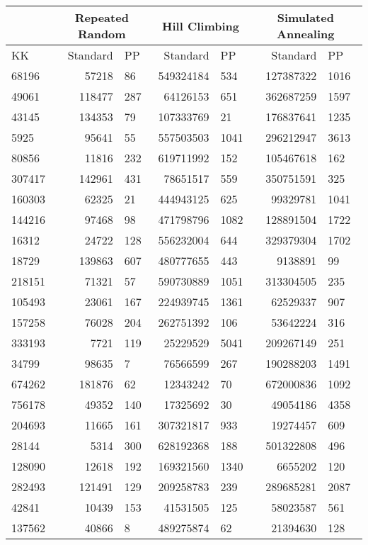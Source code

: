 \documentclass[11pt]{article}
\begin{document}
\begin{tabular}{l r l r l r l}
 & \multicolumn{2}{c}{Repeated Random} & \multicolumn{2}{c}{Hill Climbing} & \multicolumn{2}{c}{Simulated Annealing} \\ \hline
KK & Standard & PP & Standard & PP & Standard & PP \\ \hline
68196 & 57218 & 86 & 549324184 & 534 & 127387322 & 1016 \\
49061 & 118477 & 287 & 64126153 & 651 & 362687259 & 1597 \\
43145 & 134353 & 79 & 107333769 & 21 & 176837641 & 1235 \\
5925 & 95641 & 55 & 557503503 & 1041 & 296212947 & 3613 \\
80856 & 11816 & 232 & 619711992 & 152 & 105467618 & 162 \\
307417 & 142961 & 431 & 78651517 & 559 & 350751591 & 325 \\
160303 & 62325 & 21 & 444943125 & 625 & 99329781 & 1041 \\
144216 & 97468 & 98 & 471798796 & 1082 & 128891504 & 1722 \\
16312 & 24722 & 128 & 556232004 & 644 & 329379304 & 1702 \\
18729 & 139863 & 607 & 480777655 & 443 & 9138891 & 99 \\
218151 & 71321 & 57 & 590730889 & 1051 & 313304505 & 235 \\
105493 & 23061 & 167 & 224939745 & 1361 & 62529337 & 907 \\
157258 & 76028 & 204 & 262751392 & 106 & 53642224 & 316 \\
333193 & 7721 & 119 & 25229529 & 5041 & 209267149 & 251 \\
34799 & 98635 & 7 & 76566599 & 267 & 190288203 & 1491 \\
674262 & 181876 & 62 & 12343242 & 70 & 672000836 & 1092 \\
756178 & 49352 & 140 & 17325692 & 30 & 49054186 & 4358 \\
204693 & 11665 & 161 & 307321817 & 933 & 19274457 & 609 \\
28144 & 5314 & 300 & 628192368 & 188 & 501322808 & 496 \\
128090 & 12618 & 192 & 169321560 & 1340 & 6655202 & 120 \\
282493 & 121491 & 129 & 209258783 & 239 & 289685281 & 2087 \\
42841 & 10439 & 153 & 41531505 & 125 & 58023587 & 561 \\
137562 & 40866 & 8 & 489275874 & 62 & 21394630 & 128 \\

\end{tabular}
\end{document}
